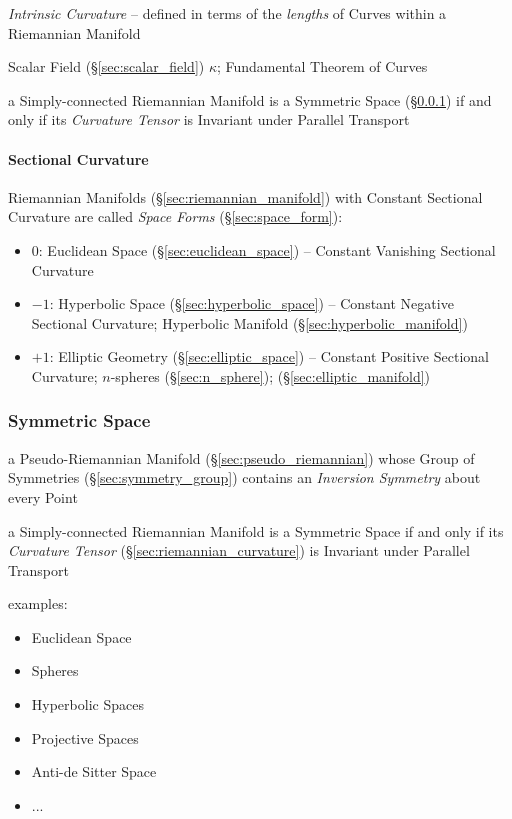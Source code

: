 \emph{Intrinsic Curvature} -- defined in terms of the \emph{lengths} of Curves
within a Riemannian Manifold

Scalar Field (\S\ref{sec:scalar_field}) $\kappa$; Fundamental Theorem of Curves

a Simply-connected Riemannian Manifold is a Symmetric Space
(\S\ref{sec:symmetric_space}) if and only if its \emph{Curvature Tensor} is
Invariant under Parallel Transport



\paragraph{Sectional Curvature}\label{sec:sectional_curvature}\hfill


Riemannian Manifolds (\S\ref{sec:riemannian_manifold}) with Constant Sectional
Curvature are called \emph{Space Forms} (\S\ref{sec:space_form}):
\begin{itemize}
  \item $0$: Euclidean Space (\S\ref{sec:euclidean_space}) -- Constant
    Vanishing Sectional Curvature
  \item $-1$: Hyperbolic Space (\S\ref{sec:hyperbolic_space}) -- Constant
    Negative Sectional Curvature; Hyperbolic Manifold
    (\S\ref{sec:hyperbolic_manifold})
  \item $+1$: Elliptic Geometry (\S\ref{sec:elliptic_space}) -- Constant
    Positive Sectional Curvature; $n$-spheres (\S\ref{sec:n_sphere});
    (\S\ref{sec:elliptic_manifold})
\end{itemize}



\subsubsection{Symmetric Space}\label{sec:symmetric_space}

a Pseudo-Riemannian Manifold (\S\ref{sec:pseudo_riemannian}) whose Group of
Symmetries (\S\ref{sec:symmetry_group}) contains an \emph{Inversion Symmetry}
about every Point

a Simply-connected Riemannian Manifold is a Symmetric Space if and only if its
\emph{Curvature Tensor} (\S\ref{sec:riemannian_curvature}) is Invariant under
Parallel Transport

examples:
\begin{itemize}
  \item Euclidean Space
  \item Spheres
  \item Hyperbolic Spaces
  \item Projective Spaces
  \item Anti-de Sitter Space
  \item ...
\end{itemize}



